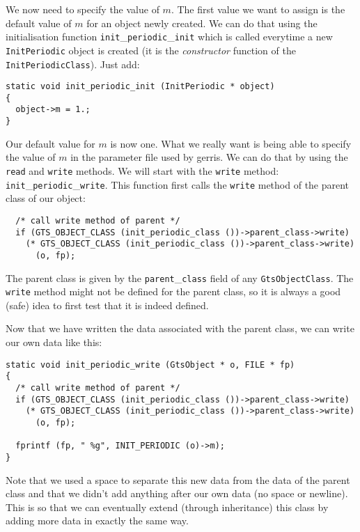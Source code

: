 \documentclass[a4paper]{article}
\begin{document}
We now need to specify the value of $m$. The first value we want to
assign is the default value of $m$ for an object newly created. We can
do that using the initialisation function {\tt init}\_{\tt periodic}\_{\tt init}
which is called everytime a new {\tt InitPeriodic} object is created
(it is the {\em constructor} function of the {\tt
InitPeriodicClass}). Just add:
\begin{verbatim}
static void init_periodic_init (InitPeriodic * object)
{
  object->m = 1.;
}
\end{verbatim}
Our default value for $m$ is now one. What we really want is being
able to specify the value of $m$ in the parameter file used by
gerris. We can do that by using the {\tt read} and {\tt write}
methods. We will start with the {\tt write} method: {\tt
init}\_{\tt periodic}\_{\tt write}. This function first calls the {\tt write} method 
of the parent class of our object:
\begin{verbatim}
  /* call write method of parent */
  if (GTS_OBJECT_CLASS (init_periodic_class ())->parent_class->write)
    (* GTS_OBJECT_CLASS (init_periodic_class ())->parent_class->write) 
      (o, fp);
\end{verbatim}
The parent class is given by the
{\tt parent}\_{\tt class} field of any {\tt GtsObjectClass}. The {\tt write}
method might not be defined for the parent class, so it is always a
good (safe) idea to first test that it is indeed defined.

Now that we have written the data associated with the parent class, we 
can write our own data like this:
\begin{verbatim}
static void init_periodic_write (GtsObject * o, FILE * fp)
{
  /* call write method of parent */
  if (GTS_OBJECT_CLASS (init_periodic_class ())->parent_class->write)
    (* GTS_OBJECT_CLASS (init_periodic_class ())->parent_class->write) 
      (o, fp);

  fprintf (fp, " %g", INIT_PERIODIC (o)->m);
}
\end{verbatim}
Note that we used a space to separate this new data from the data of
the parent class and that we didn't add anything after our own data
(no space or newline). This is so that we can eventually extend
(through inheritance) this class by adding more data in exactly the
same way.
\end{document}
